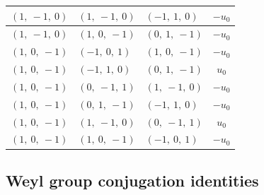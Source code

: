 \documentclass[11pt]{article}
\theoremstyle{definition}
\begin{document}
\begin{longtable}{|l|l|l|c|}
    \hline
    $\left( 1, \  -1, \  0\right)$ & $\left( 1, \  -1, \  0\right)$ & $\left( -1, \  1, \  0\right)$ & $- u_{0}$ \\
    \hline
    $\left( 1, \  -1, \  0\right)$ & $\left( 1, \  0, \  -1\right)$ & $\left( 0, \  1, \  -1\right)$ & $- u_{0}$ \\
    \hline
    $\left( 1, \  0, \  -1\right)$ & $\left( -1, \  0, \  1\right)$ & $\left( 1, \  0, \  -1\right)$ & $- u_{0}$ \\
    \hline
    $\left( 1, \  0, \  -1\right)$ & $\left( -1, \  1, \  0\right)$ & $\left( 0, \  1, \  -1\right)$ & $u_{0}$ \\
    \hline
    $\left( 1, \  0, \  -1\right)$ & $\left( 0, \  -1, \  1\right)$ & $\left( 1, \  -1, \  0\right)$ & $- u_{0}$ \\
    \hline
    $\left( 1, \  0, \  -1\right)$ & $\left( 0, \  1, \  -1\right)$ & $\left( -1, \  1, \  0\right)$ & $- u_{0}$ \\
    \hline
    $\left( 1, \  0, \  -1\right)$ & $\left( 1, \  -1, \  0\right)$ & $\left( 0, \  -1, \  1\right)$ & $u_{0}$ \\
    \hline
    $\left( 1, \  0, \  -1\right)$ & $\left( 1, \  0, \  -1\right)$ & $\left( -1, \  0, \  1\right)$ & $- u_{0}$ \\
    \hline
\end{longtable}


\subsection{Weyl group conjugation identities}
\end{document}

